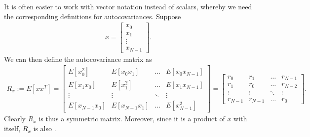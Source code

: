 \documentclass[letterpaper,10pt,english]{jupyterBook}
\begin{document}
\sphinxAtStartPar
It is often easier to work with vector notation instead of scalars,
whereby we need the corresponding definitions for autocovariances.
Suppose
\begin{equation*}
\begin{split} x =
\begin{bmatrix}x_0\\x_1\\\vdots\\x_{N-1}\end{bmatrix}. \end{split}
\end{equation*}
\sphinxAtStartPar
We can then define the autocovariance matrix as
\begin{equation*}
\begin{split} R_x := E[x x^T] = \begin{bmatrix}E[x_0^2] & E[x_0x_1] &
\dots & E[x_0x_{N-1}]\\E[x_1x_0] & E[x_1^2] & \dots &
E[x_1x_{N-1}]\\\vdots&\vdots&\ddots&\vdots\\E[x_{N-1}x_0]
& E[x_{N-1}x_1] & \dots & E[x_{N-1}^2]\end{bmatrix} =
\begin{bmatrix}r_0 & r_1 & \dots & r_{N-1}\\ r_1 & r_0 & \dots &
r_{N-2}\\\vdots&\vdots&\ddots&\vdots\\r_{N-1} & r_{N-1} &
\dots & r_0\end{bmatrix}. \end{split}
\end{equation*}
\sphinxAtStartPar
Clearly \(R_{x}\) is thus a symmetric
 matrix.
Moreover, since it is a product of \(x\) with itself, \(R_{x}\) is
also .

\sphinxstepscope
\end{document}
